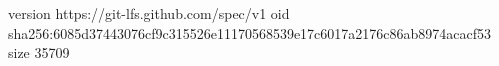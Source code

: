 version https://git-lfs.github.com/spec/v1
oid sha256:6085d37443076cf9c315526e11170568539e17c6017a2176c86ab8974acacf53
size 35709
